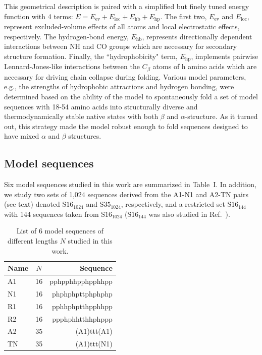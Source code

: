 \documentclass[
aip,
rsi,%
amsmath,amssymb,
reprint,%
]{revtex4-1}
\begin{document}
This geometrical description is paired with a simplified but finely tuned energy function with 4 terms: $E= E_\mathrm{ev} + E_\mathrm{loc} + E_\mathrm{hb} + E_\mathrm{hp}$. The first two, $E_\mathrm{ev}$ and $E_\mathrm{loc}$, represent excluded-volume effects of all atoms and local electrostatic effects, respectively. The hydrogen-bond energy, $E_\mathrm{hb}$, represents directionally dependent interactions between NH and CO groups which are necessary for secondary structure formation. Finally, the ``hydrophobicity" term, $E_\mathrm{hp}$, implements pairwise Lennard-Jones-like interactions between the $C_\beta$ atoms of h amino acids which are necessary for driving chain collapse during folding. Various model parameters, e.g., the strengths of hydrophobic attractions and hydrogen bonding, were determined based on the ability of the model to spontaneously fold a set of model sequences with 18-54 amino acids into  structurally diverse and thermodynamically stable native states with both $\beta$ and $\alpha$-structure. As it turned out, this strategy made the model robust enough to fold sequences designed to have mixed $\alpha$ and $\beta$ structures. 

\subsection{Model sequences}

Six model sequences studied in this work are summarized in Table~I. In addition, we study two sets of 1,024 sequences derived from the A1-N1 and A2-TN pairs (see text) denoted $\mathrm{S16}_{1024}$  and $\mathrm{S35}_{1024}$, respectively, and a restricted set $\mathrm{S16}_{144}$ with 144 sequences taken from $\mathrm{S16}_{1024}$ ($\mathrm{S16}_{144}$ was also studied in Ref.~\protect{}).
 
\begin{table}
\caption{\label{tab1} List of 6 model sequences of different lengths $N$ studied in this work.}
\begin{ruledtabular}
\begin{tabular}{lcr}
Name & $N$ & Sequence \\
\hline
A1 & 16 & pphpphhpphpphhpp \\
N1 & 16 & phphphpttphphphp \\
R1 & 16 & pphhphptthpphhpp\\
R2 & 16 & ppphphhtthhphppp\\
A2 & 35 & (A1)ttt(A1)\\
TN & 35 & (A1)ttt(N1)\\
\end{tabular}
\end{ruledtabular}
\end{table}
\end{document}
